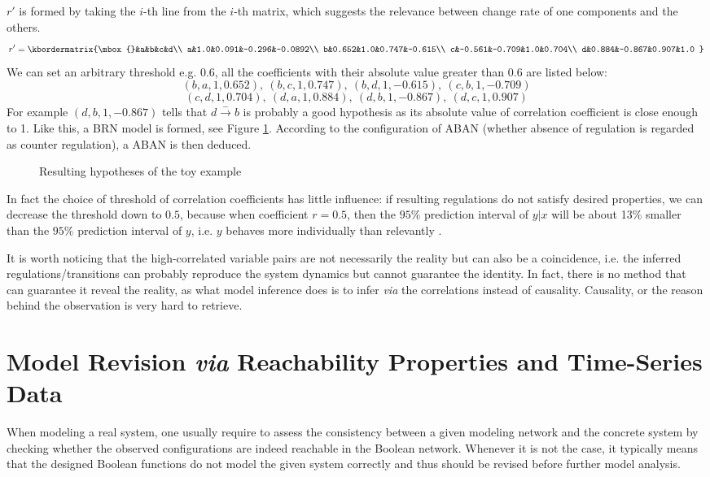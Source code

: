  $r'$ is formed by taking the $i$-th line from the $i$-th matrix, which suggests the relevance between change rate of one components and the others.
$$r'=\kbordermatrix{\mbox{}&a&b&c&d\\
a&1.0&0.091&-0.296&-0.0892\\
b&0.652&1.0&0.747&-0.615\\
c&-0.561&-0.709&1.0&0.704\\
d&0.884&-0.867&0.907&1.0
}$$
We can set an arbitrary threshold e.g. 0.6, all the coefficients with their absolute value greater than 0.6 are listed below:
$$(b,a,1,0.652),\ (b,c,1,0.747),\ (b,d,1,-0.615),\ (c,b,1,-0.709)$$
$$(c,d,1,0.704),\ (d,a,1,0.884),\ (d,b,1,-0.867),\ (d,c,1,0.907)$$
For example $(d,b,1,-0.867)$ tells that $d\xrightarrow{-}b$ is probably a good hypothesis as its absolute value of correlation coefficient is close enough to 1. Like this, a BRN model is formed, see Figure \ref{ResultBRN}. According to the configuration of ABAN (whether absence of regulation is regarded as counter regulation), a ABAN is then deduced.

\begin{figure}[ht]
\centering

\caption{Resulting hypotheses of the toy example}\label{ResultBRN}
\end{figure}

In fact the choice of threshold of correlation coefficients has little influence: if resulting regulations do not satisfy desired properties, we can decrease the threshold down to $0.5$, because when coefficient $r =0.5$, then the $95\%$ prediction interval of $y|x$ will be about 13\% smaller than the $95\%$ prediction interval of $y$, i.e. $y$ behaves more individually than relevantly \cite{hull1927correlation}.

It is worth noticing that the high-correlated variable pairs are not necessarily the reality but can also be a coincidence, i.e. the inferred regulations/transitions can probably reproduce the system dynamics but cannot guarantee the identity.
In fact, there is no method that can guarantee it reveal the reality, as what model inference does is to infer \textit{via} the correlations instead of causality.
Causality, or the reason behind the observation is very hard to retrieve.

\section{Model Revision \textit{via} Reachability Properties and Time-Series Data}
When modeling a real system, one usually require to assess the consistency between a given modeling network and the concrete system by checking whether the observed configurations are indeed reachable in the Boolean network.
Whenever it is not the case, it typically means that the designed Boolean functions do not model the given system correctly and thus should be revised before further model analysis.

